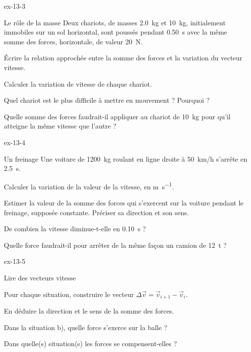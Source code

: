 \begin{blocLivre}{ex-13-3}
\begin{exercice}[1]{Le rôle de la masse}
Deux chariots, de masses \qty{2,0}{kg} et \qty{10}{kg}, initialement immobiles sur un sol horizontal, sont poussés pendant \qty{0,50}{s} avec
la même somme des forces, horizontale, de valeur \qty{20}{N}.
\begin{questions}
\item Écrire la relation approchée entre la somme des forces et la variation du vecteur vitesse.
\item Calculer la variation de vitesse de chaque chariot.
\item Quel chariot est le plus difficile à mettre en mouvement ? Pourquoi ?
\item Quelle somme des forces faudrait-il appliquer au chariot de \qty{10}{kg} pour qu'il atteigne la même vitesse que l'autre ?
\end{questions}
\end{exercice}
\end{blocLivre}
\begin{blocLivre}{ex-13-4}
\begin{exercice}[1]{Un freinage}
Une voiture de \qty{1200}{kg} roulant en ligne droite à \qty{50}{km/h} s'arrête en \qty{2,5}{s}.
\begin{questions}
\item Calculer la variation de la valeur de la vitesse, en \unit{m.s^{-1}}.
\item Estimer la valeur de la somme des forces qui s'exercent sur la voiture pendant le freinage, supposée constante.
Préciser sa direction et son sens.
\item De combien la vitesse diminue-t-elle en \qty{0,10}{s} ?
\item Quelle force faudrait-il pour arrêter de la même façon un camion de \qty{12}{t} ?
\end{questions}
\end{exercice}
\end{blocLivre}
\begin{blocLivre}{ex-13-5}
\begin{exercice}[1]{Lire des vecteurs vitesse}
\begin{questions}
\item Pour chaque situation, construire le vecteur $\Delta\vec{v}=\vec{v}_{i+1}-\vec{v}_i$.
\item En déduire la direction et le sens de la somme des forces.
\item Dans la situation b), quelle force s'exerce sur la balle ?
\item Dans quelle(s) situation(s) les forces se compensent-elles ?
\end{questions}
\end{exercice}
\end{blocLivre}
